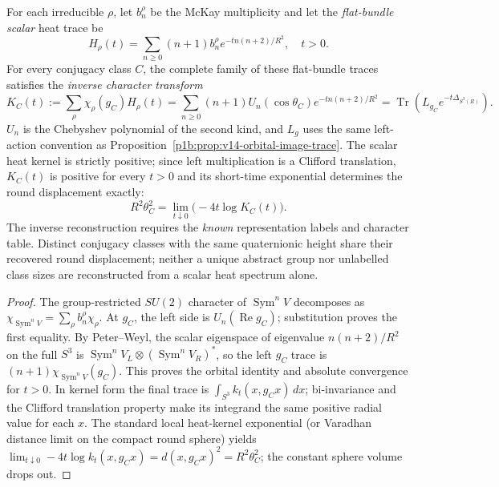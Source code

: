 \documentclass[11pt]{article}
\begin{document}
\begin{theorem}
\label{p1b:thm:v16-flat-heat-inversion}
For each irreducible $\rho$, let $b_n^\rho$ be the McKay
multiplicity and let the \emph{flat-bundle scalar} heat trace
be
\[H_\rho(t)=\sum_{n\ge0}(n+1)b_n^\rho
                         e^{-tn(n+2)/R^2},\quad t>0.
\]
For every conjugacy class $C$, the complete family of these
flat-bundle traces satisfies the \emph{inverse character transform}
\begin{equation}
\boxed{
K_C(t):=\sum_\rho\chi_\rho(g_C)H_\rho(t)
 =\sum_{n\ge0}(n+1)U_n(\cos\theta_C)
           e^{-tn(n+2)/R^2}
 =\operatorname{Tr}(L_{g_C}e^{-t\Delta_{S^3(R)}}).}
\tag{T16.5}\label{p1b:eq:v16-flat-inversion}
\end{equation}
$U_n$ is the Chebyshev polynomial of the second kind, and $L_g$
uses the same left-action convention as
Proposition~\ref{p1b:prop:v14-orbital-image-trace}.
The scalar heat kernel is strictly positive; since left
multiplication is a Clifford translation, $K_C(t)$ is positive
for every $t>0$ and its short-time exponential determines the
round displacement exactly:
\begin{equation}
\boxed{R^2\theta_C^2=
       \lim_{t\downarrow0}\bigl(-4t\log K_C(t)\bigr).}
\tag{T16.6}\label{p1b:eq:v16-distance-heat}
\end{equation}
The inverse reconstruction requires the \emph{known}
representation labels and character table.  Distinct conjugacy
classes with the same quaternionic height share their recovered
round displacement; neither a unique abstract group nor unlabelled
class sizes are reconstructed from a scalar heat spectrum alone.
\end{theorem}
\begin{proof}
The group-restricted $SU(2)$ character of
$\operatorname{Sym}^n V$ decomposes as
$\chi_{\operatorname{Sym}^n V}
 =\sum_\rho b_n^\rho\chi_\rho$.
At $g_C$, the left side is $U_n(\operatorname{Re}g_C)$;
substitution proves the first equality.  By Peter--Weyl,
the scalar eigenspace of eigenvalue $n(n+2)/R^2$ on the full
$S^3$ is $\operatorname{Sym}^nV_L\otimes
(\operatorname{Sym}^nV_R)^*$, so the left $g_C$ trace is
$(n+1)\chi_{\operatorname{Sym}^nV}(g_C)$.
This proves the orbital identity and absolute convergence for $t>0$.
In kernel form the final trace is
$\int_{S^3}k_t(x,g_Cx)\,dx$; bi-invariance and the Clifford
translation property make its integrand the same positive radial
value for each $x$.  The standard local heat-kernel exponential
(or Varadhan distance limit on the compact round sphere) yields
$\lim_{t\downarrow0}-4t\log k_t(x,g_Cx)
 =d(x,g_Cx)^2=R^2\theta_C^2$; the constant sphere volume drops out.
\end{proof}
\end{document}
